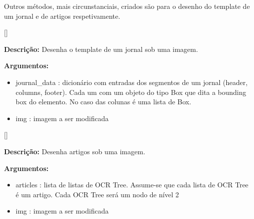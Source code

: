 
Outros métodos, mais circunstanciais, criados são para o desenho do template de um jornal e de artigos respetivamente.

[\normalsize]

\textbf{Descrição:} Desenha o template de um jornal sob uma imagem.

\textbf{Argumentos:}
\begin{itemize}\setlength\itemsep{-0.3em}
	\item journal\_data : dicionário com entradas dos segmentos de um jornal (header, columns, footer). Cada um com um objeto do tipo Box que dita a bounding box do elemento. No caso das colunas é uma lista de Box.
	\item img : imagem a ser modificada
\end{itemize}


[\normalsize]

\textbf{Descrição:} Desenha artigos sob uma imagem.

\textbf{Argumentos:}
\begin{itemize}\setlength\itemsep{-0.3em}
	\item articles : lista de listas de OCR Tree. Assume-se que cada lista de OCR Tree é um artigo. Cada OCR Tree será um nodo de nível 2
	\item img : imagem a ser modificada
\end{itemize}



\label{contribution_text_analyses}


\label{contribution_clean_ocr}


\label{contribution_categorize_blocks}


\label{contribution_divide_blocks}


\label{contribution_reading_order}

\label{contribution_result_segmentation}

